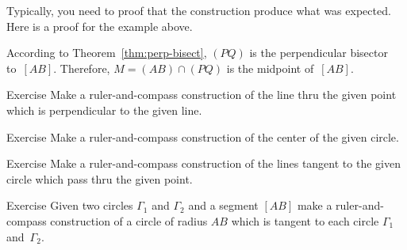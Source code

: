 \medskip

Typically, you need to proof that the construction produce what was expected. Here is a proof for the example above.

According to Theorem~\ref{thm:perp-bisect}, $(PQ)$ is the perpendicular bisector to~$[AB]$.
Therefore, $M=(AB)\cap(PQ)$ is the midpoint of~$[AB]$. 
\qeds

\begin{thm}{Exercise}\label{ex:construction-perpendicular}
Make a ruler-and-compass construction of the line thru the given point which is perpendicular to the given line.
\end{thm}

\begin{thm}{Exercise}\label{ex:center}
Make a ruler-and-compass construction of the center 
of the given circle.
\end{thm}

\begin{thm}{Exercise}\label{ex:tangent}
Make a ruler-and-compass construction of the lines tangent to the given circle which pass thru the given point.
\end{thm}

\begin{thm}{Exercise}\label{ex:tangent-circle}
Given two circles $\Gamma_1$ and $\Gamma_2$ and a segment $[AB]$
make a ruler-and-compass construction of a circle of radius $AB$ 
which is tangent to each circle $\Gamma_1$ and~$\Gamma_2$.
\end{thm}




